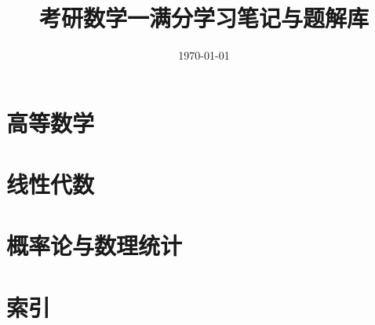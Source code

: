 \documentclass[12pt,a4paper]{article}
\title{考研数学一满分学习笔记与题解库}
\author{}
\date{\today}
\begin{document}
\maketitle
\tableofcontents
\clearpage

\section{高等数学}



















\section{线性代数}








\section{概率论与数理统计}







\appendix
\section{索引}




\end{document}
